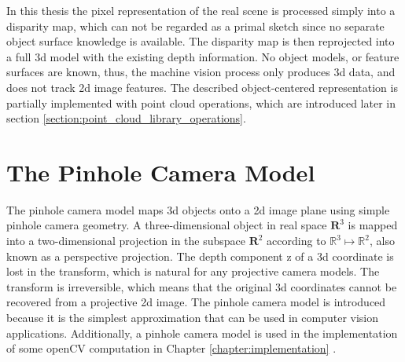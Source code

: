 \documentclass[12pt,a4paper,oneside,pdftex]{report}
\begin{document}
{\cite{Sonka07}

In this thesis the pixel representation of the real scene is processed simply into a disparity map, which can not be regarded as a primal sketch since no separate object surface knowledge is available. The disparity map is then reprojected into a full 3d model with the existing depth information. No object models, or feature surfaces are known, thus, the machine vision process only produces 3d data, and does not track 2d image features. The described object-centered representation is partially implemented with point cloud operations, which are introduced later in section \ref{section:point_cloud_library_operations}.


\section{The Pinhole Camera Model}
\label{section:the_pinhole_camera_model}

The pinhole camera model maps 3d objects onto a 2d image plane using simple pinhole camera geometry. A three-dimensional object in real space $\mathbf{R}^3$ is mapped into a two-dimensional projection in the subspace $\mathbf{R}^2$ according to $\mathbb{R}^3 \mapsto \mathbb{R}^2$, also known as a perspective projection. The depth component z of a 3d coordinate is lost in the transform, which is natural for any projective camera models. The transform is irreversible, which means that the original 3d coordinates cannot be recovered from a projective 2d image. The pinhole camera model is introduced because it is the simplest approximation that can be used in computer vision applications. Additionally, a pinhole camera model is used in the implementation of some openCV computation in Chapter \ref{chapter:implementation} \citep{Sonka07, OpenCVWeb}.

}
\end{document}
